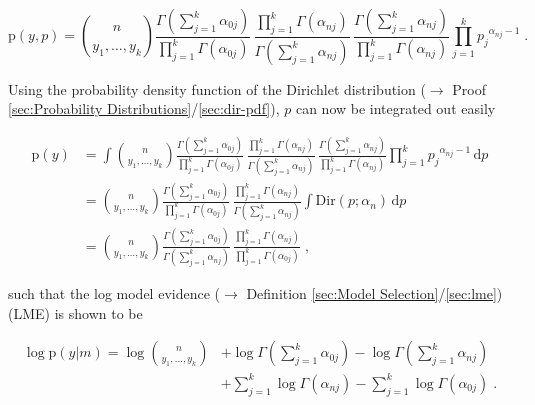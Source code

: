 \documentclass[a4paper,12pt,twoside]{book}
\begin{document}
\begin{equation} \label{eq:mult-lme-Mult-JL-s2}
\mathrm{p}(y,p) = {n \choose {y_1, \ldots, y_k}} \frac{\Gamma \left( \sum_{j=1}^{k} \alpha_{0j} \right)}{\prod_{j=1}^k \Gamma(\alpha_{0j})} \, \frac{\prod_{j=1}^k \Gamma(\alpha_{nj})} {\Gamma \left( \sum_{j=1}^{k} \alpha_{nj} \right)} \, \frac{\Gamma \left( \sum_{j=1}^{k} \alpha_{nj} \right)}{\prod_{j=1}^k \Gamma(\alpha_{nj})} \prod_{j=1}^{k} {p_j}^{\alpha_{nj}-1} \; .
\end{equation}

Using the probability density function of the Dirichlet distribution ($\rightarrow$ Proof \ref{sec:Probability Distributions}/\ref{sec:dir-pdf}), $p$ can now be integrated out easily

\begin{equation} \label{eq:mult-lme-Mult-ME-s2}
\begin{split}
\mathrm{p}(y) &= \int {n \choose {y_1, \ldots, y_k}} \frac{\Gamma \left( \sum_{j=1}^{k} \alpha_{0j} \right)}{\prod_{j=1}^k \Gamma(\alpha_{0j})} \, \frac{\prod_{j=1}^k \Gamma(\alpha_{nj})}{\Gamma \left( \sum_{j=1}^{k} \alpha_{nj} \right)} \, \frac{\Gamma \left( \sum_{j=1}^{k} \alpha_{nj} \right)}{\prod_{j=1}^k \Gamma(\alpha_{nj})} \prod_{j=1}^{k} {p_j}^{\alpha_{nj}-1} \, \mathrm{d}p \\
&= {n \choose {y_1, \ldots, y_k}} \frac{\Gamma \left( \sum_{j=1}^{k} \alpha_{0j} \right)}{\prod_{j=1}^k \Gamma(\alpha_{0j})} \, \frac{\prod_{j=1}^k \Gamma(\alpha_{nj})}{\Gamma \left( \sum_{j=1}^{k} \alpha_{nj} \right)} \int \mathrm{Dir}(p; \alpha_n) \, \mathrm{d}p \\
&= {n \choose {y_1, \ldots, y_k}} \frac{\Gamma \left( \sum_{j=1}^{k} \alpha_{0j} \right)}{\Gamma \left( \sum_{j=1}^{k} \alpha_{nj} \right)} \, \frac{\prod_{j=1}^k \Gamma(\alpha_{nj})}{\prod_{j=1}^k \Gamma(\alpha_{0j})} \; ,
\end{split}
\end{equation}

such that the log model evidence ($\rightarrow$ Definition \ref{sec:Model Selection}/\ref{sec:lme}) (LME) is shown to be

\begin{equation} \label{eq:mult-lme-Mult-LME-s1}
\begin{split}
\log \mathrm{p}(y|m) = \log {n \choose {y_1, \ldots, y_k}} &+ \log \Gamma \left( \sum_{j=1}^{k} \alpha_{0j} \right) - \log \Gamma \left( \sum_{j=1}^{k} \alpha_{nj} \right) \\
&+ \sum_{j=1}^k \log \Gamma(\alpha_{nj}) - \sum_{j=1}^k \log \Gamma(\alpha_{0j}) \; .
\end{split}
\end{equation}
\end{document}
